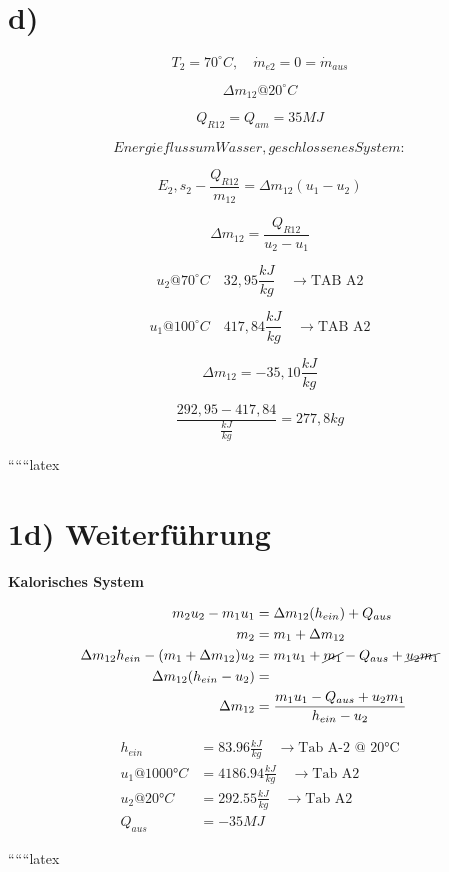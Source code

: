 

\section*{d)}

\[
T_2 = 70^\circ C, \quad \dot{m}_{e2} = 0 = \dot{m}_{aus}
\]

\[
\Delta m_{12} @ 20^\circ C
\]

\[
Q_{R12} = Q_{am} = 35 MJ
\]

\[
Energiefluss um Wasser, geschlossenes System:
\]

\[
E_2, s_2 - \frac{Q_{R12}}{m_{12}} = \Delta m_{12} (u_1 - u_2)
\]

\[
\Delta m_{12} = \frac{Q_{R12}}{u_2 - u_1}
\]

\[
u_2 @ 70^\circ C \quad 32{,}95 \frac{kJ}{kg} \quad \rightarrow \text{TAB A2}
\]

\[
u_1 @ 100^\circ C \quad 417{,}84 \frac{kJ}{kg} \quad \rightarrow \text{TAB A2}
\]

\[
\Delta m_{12} = -35{,}10 \frac{kJ}{kg}
\]

\[
\frac{292{,}95 - 417{,}84}{\frac{kJ}{kg}} = 277{,}8 kg
\]

``````latex

\section*{1d) Weiterführung}

\textbf{Kalorisches System}

\begin{align*}
m_2 u_2 - m_1 u_1 &= \Delta m_{12} (h_{ein}) + Q_{aus} \\
m_2 &= m_1 + \Delta m_{12} \\
\Delta m_{12} h_{ein} - (m_1 + \Delta m_{12}) u_2 &= m_1 u_1 + \cancel{m_1} - Q_{aus} + \cancel{u_2 m_1} \\
\Delta m_{12} (h_{ein} - u_2) &= \\
\Delta m_{12} &= \frac{m_1 u_1 - Q_{aus} + u_2 m_1}{h_{ein} - u_2}
\end{align*}

\begin{align*}
h_{ein} &= 83.96 \frac{kJ}{kg} \quad \rightarrow \text{Tab A-2 @ 20°C} \\
u_1 @ 1000°C &= 4186.94 \frac{kJ}{kg} \quad \rightarrow \text{Tab A2} \\
u_2 @ 20°C &= 292.55 \frac{kJ}{kg} \quad \rightarrow \text{Tab A2} \\
Q_{aus} &= -35 MJ
\end{align*}

``````latex